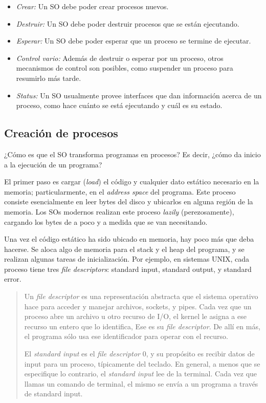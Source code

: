 \documentclass[a4paper, 12pt]{article}
\begin{document}
\begin{itemize}
    \item \textit{Crear:} Un SO debe poder crear procesos nuevos.
    \item \textit{Destruir:} Un SO debe poder destruir procesos que se están
        ejecutando.
    \item \textit{Esperar:} Un SO debe poder esperar que un proceso se 
        termine de ejecutar. 
    \item \textit{Control vario:} Además de destruir o esperar por un proceso, 
        otros mecanismos de control son posibles, como suspender 
        un proceso para resumirlo más tarde. 
    \item \textit{Status:} Un SO usualmente provee interfaces que 
        dan información acerca de un proceso, como hace cuánto 
        se está ejecutando y cuál es su estado.
\end{itemize}

\subsection{Creación de procesos}

¿Cómo es que el SO transforma programas en procesos? Es decir, ¿cómo 
da inicio a la ejecución de un programa?

El primer paso es cargar (\textit{load}) el código y cualquier dato estático
necesario en la memoria; particularmente, en el \textit{address space} del
programa. Este proceso consiste esencialmente en leer bytes del disco y
ubicarlos en alguna región de la memoria. Los SOs modernos realizan este
proceso \textit{lazily} (perezosamente), cargando los bytes de a poco y a
medida que se van necesitando.

Una vez el código estático ha sido ubicado en memoria, hay poco más 
que deba hacerse. Se aloca algo de memoria para el stack y el heap 
del programa, y se realizan algunas tareas de inicialización. Por 
ejemplo, en sistemas UNIX, cada proceso tiene tres \textit{file descriptors}:
standard input, standard output, y standard error.

\begin{quote}
    Un \textit{file descriptor} es una representación abstracta que el 
    sistema operativo hace para acceder y manejar archivos, sockets,
    y pipes. Cada vez que un proceso abre un archivo u otro recurso
    de I/O, el kernel le asigna a ese recurso un entero que lo identifica,
    Ese es su \textit{file descriptor}. De allí en más, el programa sólo
    usa ese identificador para operar con el recurso.  

    El \textit{standard input} es el \textit{file descriptor} 0, y 
    su propósito es recibir datos de input para un proceso,
    típicamente del teclado. En general, a menos que se especifique 
    lo contrario, el \textit{standard input} lee de la terminal.
    Cada vez que llamas un comando de terminal, el mismo se envía
    a un programa a través de standard input.
\end{quote}
\end{document}
